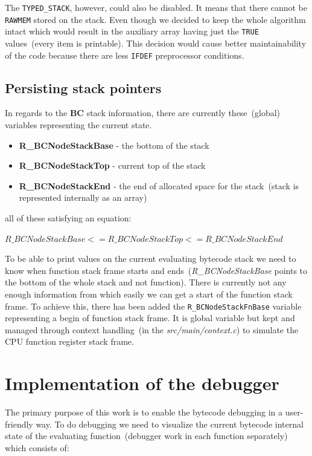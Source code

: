 \documentclass[thesis=M,english]{FITthesis}[2018/10/20]
\newcommand{\code}[1]{\texttt{#1}}
\begin{document}
The \code{TYPED{\_}STACK}, however, could also be disabled. It means that there cannot be \code{RAWMEM} stored on the stack. Even though we decided to keep the whole algorithm intact which would result in the auxiliary array having just the \code{TRUE} values~(every item is printable). This decision would cause better maintainability of the code because there are less \code{IFDEF} preprocessor conditions.

\subsection{Persisting stack pointers}\label{persisting-stack-pointers}

In regards to the \textbf{BC} stack information, there are currently these~(global) variables representing the current state.

\begin{itemize}
	\item \textbf{R{\_}BCNodeStackBase} - the bottom of the stack
	\item \textbf{R{\_}BCNodeStackTop} - current top of the stack
	\item \textbf{R{\_}BCNodeStackEnd} - the end of allocated space for the stack~(stack is represented internally as an array)
\end{itemize}

all of these satisfying an equation:

$R{\_}BCNodeStackBase <= R{\_}BCNodeStackTop <= R{\_}BCNodeStackEnd$


To be able to print values on the current evaluating bytecode stack we need to know when function stack frame starts and ends~(\textit{R{\_}BCNodeStackBase} points to the bottom of the whole stack and not function). There is currently not any enough information from which easily we can get a start of the function stack frame. To achieve this, there has been added the \code{R{\_}BCNodeStackFnBase} variable representing a begin of function stack frame. It is global variable but kept and managed through context handling~(in the \textit{src/main/context.c}) to simulate the CPU function register stack frame.

\section{Implementation of the debugger}\label{implementation-of-debugger}

The primary purpose of this work is to enable the bytecode debugging in a user-friendly way. To do debugging we need to visualize the current bytecode internal state of the evaluating function~(debugger work in each function separately) which consists of:
\end{document}
